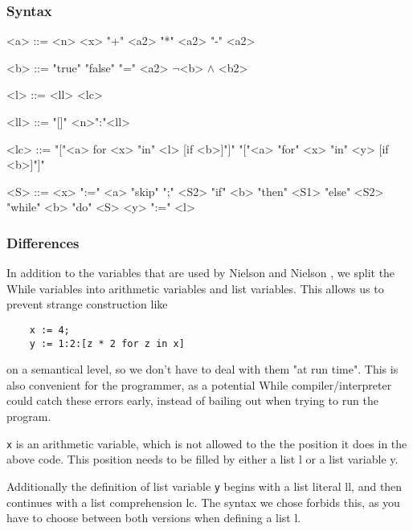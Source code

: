 \documentclass[12pt]{article}
\newcommand\mono\texttt
\newcommand{\metavar}[1]{\textlangle#1\textrangle}
\begin{document}
\subsubsection{Syntax}

\begin{grammar}
    <a> ::= <n>
    \alt <x>
     "+" <a2>
     "*" <a2>
     "-" <a2>

    <b> ::= "true"
    \alt "false"
     "=" <a2>
    \alt $\lnot$<b>
     $\land$ <b2>

    <l> ::= <ll>
    \alt <lc>

    <ll> ::= "[]"
    \alt <n>":"<ll>

    <lc> ::= "["<a> for <x> "in" <l> [if <b>]"]"
    \alt "["<a> "for" <x> "in" <y> [if <b>]"]"

    <S> ::= <x> ":=" <a>
    \alt "skip"
     ";" <S2>
    \alt "if" <b> "then" <S1> "else" <S2>
    \alt "while" <b> "do" <S>
    \alt <y> ":=" <l>
\end{grammar}

\subsubsection{Differences}

In addition to the variables that are used by Nielson and Nielson \cite{wiley}, we split the While variables into arithmetic variables and list variables. This allows us to prevent strange construction like

\begin{lstlisting}
    x := 4;
    y := 1:2:[z * 2 for z in x]
\end{lstlisting}

on a semantical level, so we don't have to deal with them "at run time". This is also convenient for the programmer, as a potential While compiler/interpreter could catch these errors early, instead of bailing out when trying to run the program.

\mono{x} is an arithmetic variable, which is not allowed to the the position it does in the above code. This position needs to be filled by either a list \metavar{l} or a list variable \metavar{y}.

Additionally the definition of list variable \mono{y} begins with a list literal \metavar{ll}, and then continues with a list comprehension \metavar{lc}. The syntax we chose forbids this, as you have to choose between both versions when defining a list \metavar{l}.
\end{document}
